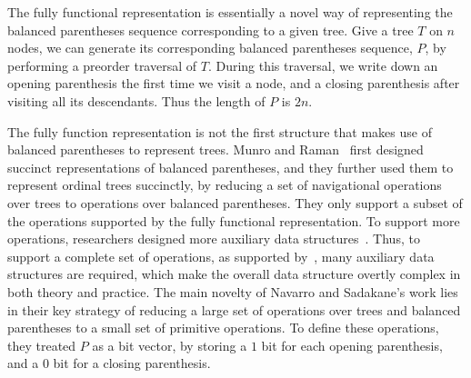 The fully functional representation is essentially a novel way of representing the balanced parentheses sequence corresponding to a given tree. 
Give a tree $T$ on $n$ nodes, we can generate its corresponding balanced parentheses sequence, $P$, by performing a preorder traversal of $T$. 
During this traversal, we write down an opening parenthesis the first time we visit a node, and a closing parenthesis after visiting all its descendants. Thus the length of $P$ is $2n$.
%
%
%

The fully function representation is not the first structure that makes use of balanced parentheses to represent trees. 
Munro and Raman~\cite{mr1997} first designed succinct representations of balanced parentheses, and they further used them to represent ordinal trees succinctly, by reducing a set of navigational operations over trees to operations over balanced parentheses. 
They only support a subset of the operations supported by the fully functional representation.
To support more operations, researchers designed more auxiliary data structures~\cite{ly2008}. 
Thus, to support a complete set of operations, as supported by~\cite{Navarro:2014:FFS:2620785.2601073},  many auxiliary data structures are required, which make the overall data structure overtly complex in both theory and practice. 
The main novelty of Navarro and Sadakane's work lies in their key strategy of reducing a large set of operations over trees and balanced parentheses to a small set of primitive operations. 
To define these operations, they treated $P$ as a bit vector, by storing a $1$ bit for each opening parenthesis, and a $0$ bit for a closing parenthesis. 
%
%

